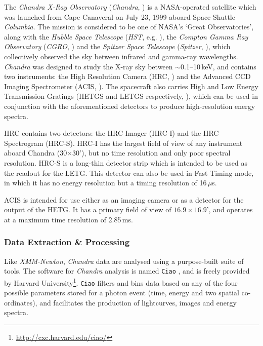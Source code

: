 \par The \textit{Chandra X-Ray Observatory} (\textit{Chandra}, \citealp{Weisskopf_Chandra}) is a NASA-operated satellite which was launched from Cape Canaveral on July 23, 1999 aboard Space Shuttle \textit{Columbia}.  The mission is considered to be one of NASA's `Great Observatories', along with the \textit{Hubble Space Telescope} (\textit{HST}, e.g. \citealp{Holtzman_Hubble}), the \textit{Compton Gamma Ray Observatory} (\textit{CGRO}, \citealp{Gehrels_CGRO}) and the \textit{Spitzer Space Telescope} (\textit{Spitzer}, \citealp{Fanson_Spitzer}), which collectively observed the sky between infrared and gamma-ray wavelengths.  \textit{Chandra} was designed to study the X-ray sky between $\sim$0.1--10\,keV, and contains two instruments: the High Resolution Camera (HRC, \citealp{Kenter_HRCI}) and the Advanced CCD Imaging Spectrometer (ACIS, \citealp{Nousek_ACIS}).  The spacecraft also carries High and Low Energy Transmission Gratings (HETGS and LETGS respectively, \citealp{Markert_HETG,Brinkman_LETG}), which can be used in conjunction with the aforementioned detectors to produce high-resolution energy spectra.
\par HRC contains two detectors: the HRC Imager (HRC-I) and the HRC Spectrogram (HRC-S).  HRC-I has the largest field of view of any instrument aboard Chandra (30$\times$30'), but no time resolution and only poor spectral resolution.  HRC-S is a long-thin detector strip which is intended to be used as the readout for the LETG.  This detector can also be used in Fast Timing mode, in which it has no energy resolution but a timing resolution of 16\,$\mu$s.
\par ACIS is intended for use either as an imaging camera or as a detector for the output of the HETG.  It has a primary field of view of $16.9\times16.9$', and operates at a maximum time resolution of 2.85\,ms.

\subsubsection{Data Extraction \& Processing}
\par Like \textit{XMM-Newton}, \textit{Chandra} data are analysed using a purpose-built suite of tools.  The software for \textit{Chandra} analysis is named \texttt{Ciao} \citep{Fruscione_Ciao}, and is freely provided by Harvard University\footnote{\url{http://cxc.harvard.edu/ciao/}}.  \texttt{Ciao} filters and bins data based on any of the four possible parameters stored for a photon event (time, energy and two spatial co-ordinates), and facilitates the production of lightcurves, images and energy spectra.

